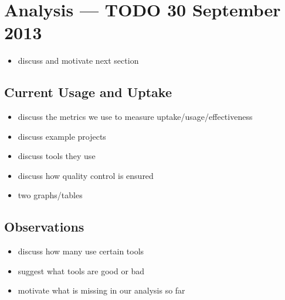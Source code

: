 \section{Analysis --- TODO 30 September 2013}

\begin{itemize}
  \item discuss and motivate next section
\end{itemize}

\subsection{Current Usage and Uptake}

\begin{itemize}
  \item discuss the metrics we use to measure uptake/usage/effectiveness
  \item discuss example projects
  \item discuss tools they use
  \item discuss how quality control is ensured
  \item two graphs/tables
\end{itemize}

\subsection{Observations}

\begin{itemize}
  \item discuss how many use certain tools
  \item suggest what tools are good or bad
  \item motivate what is missing in our analysis so far
\end{itemize}
